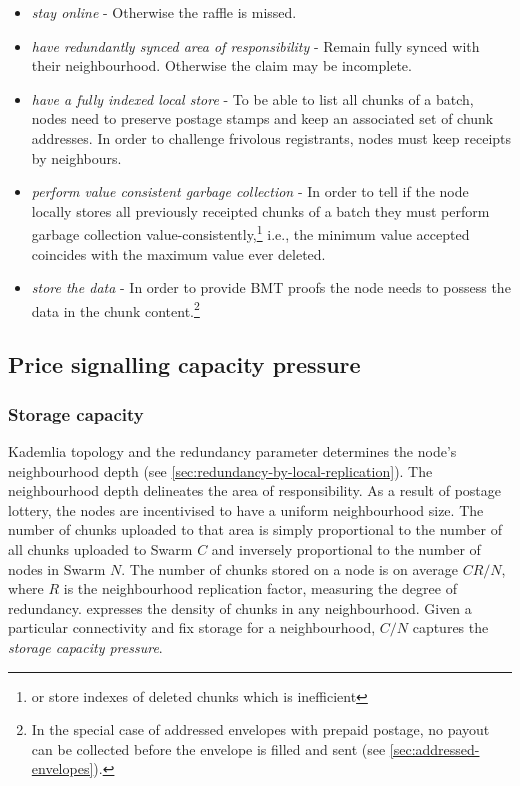 \begin{itemize}
\item \emph{stay online} - Otherwise the raffle is missed.
\item \emph{have redundantly synced area of responsibility} - Remain fully synced with their neighbourhood. Otherwise the claim may be incomplete.
\item \emph{have a fully indexed local store} - To be able to list all chunks of a batch, nodes need to preserve postage stamps and keep an associated set of chunk addresses. In order to challenge frivolous registrants, nodes must keep receipts by neighbours.
\item \emph{perform value consistent garbage collection} - In order to tell if the node locally stores all previously receipted chunks of a batch they must perform garbage collection value-consistently,\footnote{or store indexes of deleted chunks which is inefficient}
i.e., the minimum value accepted coincides with the maximum value ever deleted.
\item \emph{store the data} - In order to provide BMT proofs the node needs to possess the data in the chunk content.\footnote{In the special case of addressed envelopes with prepaid postage, no payout can be collected before the envelope is filled and sent (see \ref{sec:addressed-envelopes}).}
\end{itemize}



\subsection{Price signalling capacity pressure}\label{sec:capacity-pressure}

\yellow{}

\subsubsection{Storage capacity}
Kademlia topology and the redundancy parameter determines the node's neighbourhood depth (see \ref{sec:redundancy-by-local-replication}). The neighbourhood depth delineates the area of responsibility. As a result of postage lottery, the nodes are incentivised to have a uniform neighbourhood size. The number of chunks uploaded to that area is simply proportional to the number of all chunks uploaded to Swarm $C$ and inversely proportional to the number of nodes in Swarm $N$. The number of chunks stored on a node is on average $CR/N$, where $R$ is the neighbourhood replication factor, measuring the degree of redundancy. expresses the density of chunks in any neighbourhood. Given a particular connectivity and fix storage for a neighbourhood, $C/N$ captures the \emph{storage capacity pressure}. 

